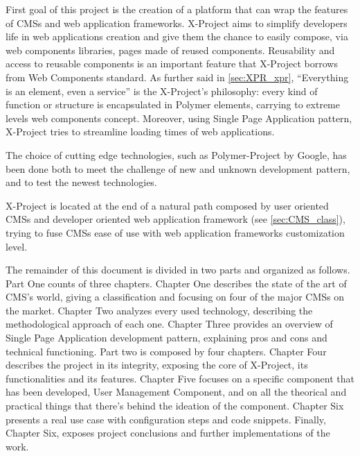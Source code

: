 First goal of this project is the creation of a platform that can wrap the features of CMSs and web application frameworks. 
X-Project aims to simplify developers life in web applications creation and give them the chance to easily compose, via web components libraries, pages made of reused components.
Reusability and access to reusable components is an important feature that X-Project borrows from Web Components standard.
As further said in \ref{sec:XPR_xpr}, ``Everything is an element, even a service'' is the X-Project's philosophy: every kind of function or structure is encapsulated in Polymer elements, carrying to extreme levels web components concept. 
Moreover, using Single Page Application pattern, X-Project tries to streamline loading times of web applications.

The choice of cutting edge technologies, such as Polymer-Project by Google, has been done both to meet the challenge of new and unknown development pattern, and to test the newest technologies.

X-Project is located at the end of a natural path composed by user oriented CMSs and developer oriented web application framework (see \ref{sec:CMS_class}), trying to fuse CMSs ease of use with web application frameworks customization level.

The remainder of this document is divided in two parts and organized as follows. Part One counts of three chapters. Chapter One describes the state of the art of CMS's world, giving a classification and focusing on four of the major CMSs on the market. Chapter Two analyzes every used technology, describing the methodological approach of each one. Chapter Three provides an overview of Single Page Application development pattern, explaining pros and cons and technical functioning.
Part two is composed by four chapters. Chapter Four describes the project in its integrity, exposing the core of X-Project, its functionalities and its features.
Chapter Five focuses on a specific component that has been developed, User Management Component, and on all the theorical and practical things that there's behind the ideation of the component. Chapter Six presents a real use case with configuration steps and code snippets.
Finally, Chapter Six, exposes project conclusions and further implementations of the work.



